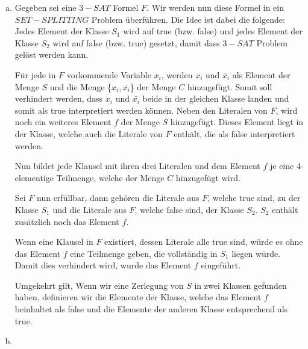 \documentclass[12pt,a4paper]{article}
\begin{document}
\begin{enumerate}[a)] 
	
	\item Gegeben sei eine $3-SAT$ Formel $F$. Wir werden nun diese Formel in ein $SET-SPLITTING$ Problem überführen. Die Idee ist dabei die folgende: Jedes Element der Klasse $S_1$ wird auf true (bzw. false) und jedes Element der Klasse $S_2$ wird auf false (bzw. true) gesetzt, damit dass $3-SAT$ Problem gelöst werden kann. 
	
	Für jede in $F$ vorkommende Variable $x_i$, werden $x_i$ und $\bar{x_i}$ als Element der Menge $S$ und die Menge \{$x_i, \bar{x_i}$\} der Menge $C$ hinzugefügt. Somit soll verhindert werden, dass $x_i$ und $\bar{x_i}$ beide in der gleichen Klasse landen und somit als true interpretiert werden können. Neben den Literalen von $F$, wird noch ein weiteres Element $f$ der Menge $S$ hinzugefügt. Dieses Element liegt in der Klasse, welche auch die Literale von $F$ enthält, die als false interpretiert werden.
	
	Nun bildet jede Klausel mit ihren drei Literalen und dem Element $f$ je eine 4-elementige Teilmenge, welche der Menge $C$ hinzugefügt wird.  
	
	Sei $F$ nun erfüllbar, dann gehören die Literale aus $F$, welche true sind, zu der Klasse $S_1$ und die Literale aus $F$, welche false sind, der Klasse $S_2$. $S_2$ enthält zusätzlich noch das Element $f$. 
	
	Wenn eine Klausel in $F$ existiert, dessen Literale alle true sind, würde es ohne das Element $f$ eine Teilmenge geben, die vollständig in $S_1$ liegen würde. Damit dies verhindert wird, wurde das Element $f$ eingeführt.
	
	Umgekehrt gilt, Wenn wir eine Zerlegung von $S$ in zwei Klassen gefunden haben, definieren wir die Elemente der Klasse, welche das Element $f$ beinhaltet als false und die Elemente der anderen Klasse entsprechend als true.
	
	\item 
\end{enumerate}
\end{document}
